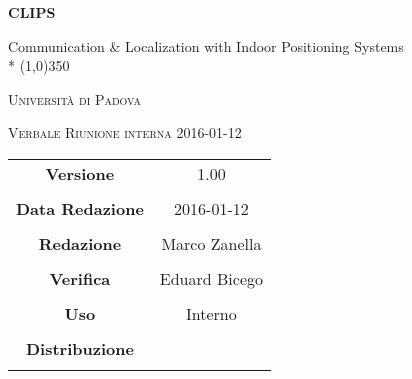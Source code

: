 \documentclass[a4paper,12pt]{article}
\begin{document}
\begin{titlepage}
	\centering
	{\huge\bfseries CLIPS\par}
	Communication \& Localization with Indoor Positioning Systems \\*
	\line(1,0){350} \\
	{\scshape\LARGE Università di Padova \par}
	\vspace{1cm}
	{\scshape\Large Verbale Riunione interna 2016-01-12 \par}
	\logo
	\newpage
	\begin{tabular}{c|c}
		{\hfill \textbf{Versione}} 			& 1.00				\\ \\
		{\hfill\textbf{Data Redazione}} 		& 2016-01-12  		\\ \\
		{\hfill\textbf{Redazione}} 			& Marco Zanella		\\ \\
		{\hfill\textbf{Verifica}} 				& Eduard Bicego 	\\ \\
		{\hfill\textbf{Uso}} 					& Interno		\\ \\
		{\hfill\textbf{Distribuzione}} 			& \leaf\		\\ \\
	\end{tabular}
\end{titlepage}
	
	\newpage

	
	\label{LastFrontPage}
	

	\newpage
	
	\pagestyle{mymain}
	
	
		

	
		
	
	
		
	
	
		
				
	\label{LastPage}
\end{document}
